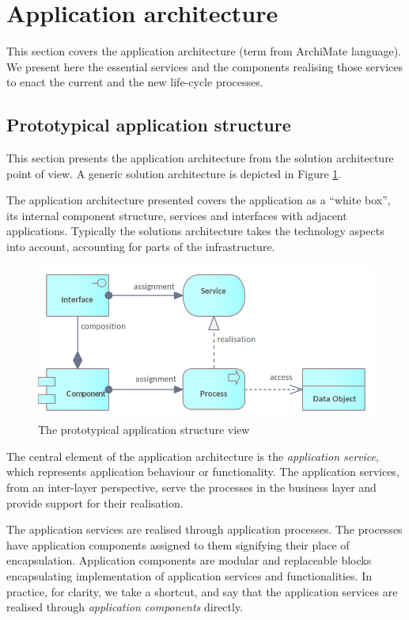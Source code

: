 \section{Application architecture}
\label{sec:application-architecture}

    This section covers the application architecture (term from ArchiMate language). We present here the essential services and the components realising those services to enact the current and the new life-cycle processes.

	\subsection{Prototypical application structure}
	
	This section presents the application architecture from the solution architecture point of view. A generic solution architecture is depicted in Figure \ref{fig:application-view}.
	
	The application architecture presented covers the application as a ``white box'', its internal component structure, services and interfaces with adjacent applications. Typically the solutions architecture takes the technology aspects into account, accounting for parts of the infrastructure.
	
    \begin{figure}[h]
		\centering
		\includegraphics[width=.5\textwidth]{images/views/Application view.png}
		\caption{The prototypical application structure view}
		\label{fig:application-view}
	\end{figure}

	The central element of the application architecture is the \textit{application service}, which represents application behaviour or functionality. The application services, from an inter-layer perspective, serve the processes in the business layer and provide support for their realisation. 
	
	The application services are realised through application processes. The processes have application components assigned to them signifying their place of encapsulation. Application components are modular and replaceable blocks encapsulating implementation of application services and functionalities. In practice, for clarity, we take a shortcut, and say that the application services are realised through \textit{application components} directly.
	
